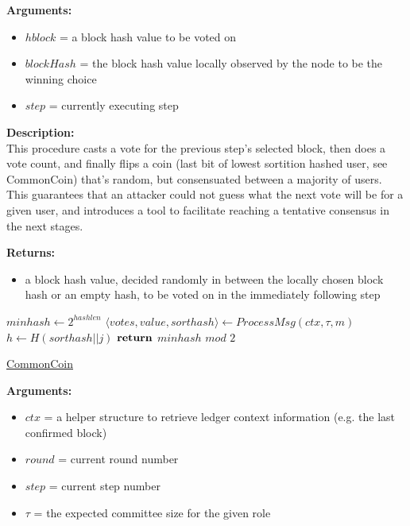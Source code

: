 \documentclass[10pt,a4paper]{article}
\begin{document}
\noindent \textbf{Arguments:}
\begin{itemize}
    \item $hblock$ = a block hash value to be voted on
    \item $blockHash$ = the block hash value locally observed by the node to be the winning choice
    \item $step$ = currently executing step
  \end{itemize}

\noindent \textbf{Description:}\\
This procedure casts a vote for the previous step's selected block, then does a vote count,
and finally flips a coin (last bit of lowest sortition hashed user, see CommonCoin) that's random,
but consensuated between a majority of users. This guarantees that an attacker could not guess what the
next vote will be for a given user, and introduces a tool to facilitate reaching a tentative consensus in the next stages.

\noindent \textbf{Returns:}
\begin{itemize}
    \item a block hash value, decided randomly in between the locally chosen block hash or an empty hash, to be voted on
    in the immediately following step
  \end{itemize}


\begin{algorithm}
    \begin{algorithmic}[H]

    \State $minhash \gets 2^{hashlen}$
        \State $\langle votes,value,sorthash\rangle \gets ProcessMsg(ctx,\tau,m)$
                \State $h \gets H(sorthash||j)$
        \EndFor
    \EndFor
    $\Return$ $minhash$ $mod$ $2$
    \EndFunction
    \end{algorithmic}
    \caption{\underline{CommonCoin}}
\end{algorithm}


\noindent \textbf{Arguments:}
\begin{itemize}
    \item $ctx$ = a helper structure to retrieve ledger context information (e.g. the last confirmed block)
    \item $round$ = current round number
    \item $step$ = current step number
    \item $\tau$ = the expected committee size for the given role
  \end{itemize}
\end{document}
